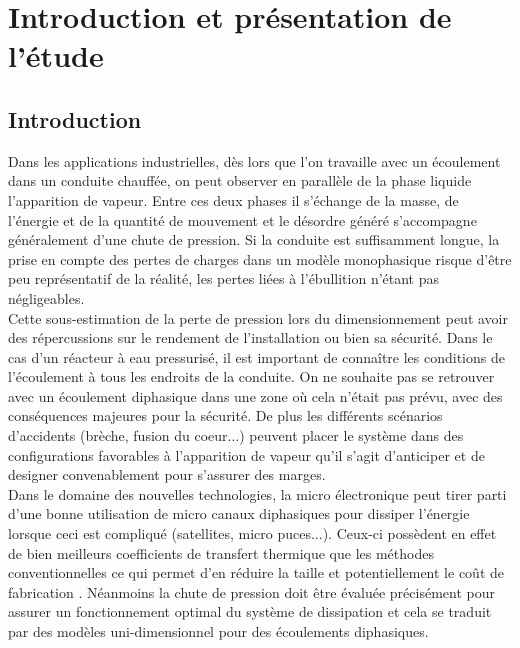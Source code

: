 \section{Introduction et présentation de l'étude\label{section:pres}}

\subsection{Introduction}

Dans les applications industrielles, dès lors que l'on travaille avec un écoulement dans un conduite chauffée, on peut observer en parallèle de la phase liquide l'apparition de vapeur. Entre ces deux phases il s'échange de la masse, de l'énergie et de la quantité de mouvement et le désordre généré s'accompagne généralement d'une chute de pression. Si la conduite est suffisamment longue, la prise en compte des pertes de charges dans un modèle monophasique risque d'être peu représentatif de la réalité, les pertes liées à l'ébullition n'étant pas négligeables.\\

Cette sous-estimation de la perte de pression lors du dimensionnement peut avoir des répercussions sur le rendement de l'installation ou bien sa sécurité. Dans le cas d'un réacteur à eau pressurisé, il est important de connaître les conditions de l'écoulement à tous les endroits de la conduite. On ne souhaite pas se retrouver avec un écoulement diphasique dans une zone où cela n'était pas prévu, avec des conséquences majeures pour la sécurité. De plus les différents scénarios d'accidents (brèche, fusion du coeur...) peuvent placer le système dans des configurations favorables à l'apparition de vapeur qu'il s'agit d'anticiper et de designer convenablement pour s'assurer des marges.\\

Dans le domaine des nouvelles technologies, la micro électronique peut tirer parti d'une bonne utilisation de micro canaux diphasiques pour dissiper l'énergie lorsque ceci est compliqué (satellites, micro puces...). Ceux-ci possèdent en effet de bien meilleurs coefficients de transfert thermique que les méthodes conventionnelles ce qui permet d'en réduire la taille et potentiellement le coût de fabrication \cite{revellinAdiabaticTwophaseFrictional2007}. Néanmoins la chute de pression doit être évaluée précisément pour assurer un fonctionnement optimal du système de dissipation et cela se traduit par des modèles uni-dimensionnel pour des écoulements diphasiques. \\

